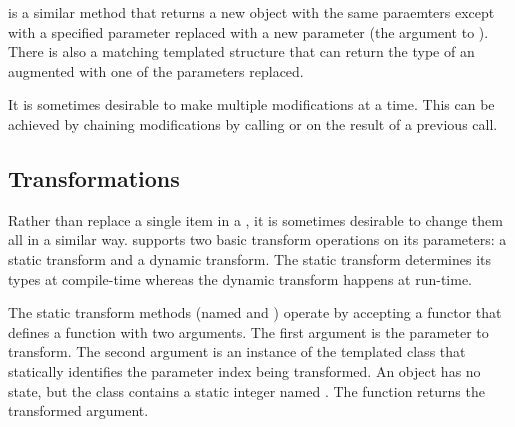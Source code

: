 


 is a similar method that returns a new
 object with the same paraemters except
with a specified parameter replaced with a new parameter (the argument to
). There is also a matching 
templated structure that can return the type of an augmented
 with one of the parameters replaced.



It is sometimes desirable to make multiple modifications at a time. This
can be achieved by chaining modifications by calling  or
 on the result of a previous call.


\subsection{Transformations}

Rather than replace a single item in a ,
it is sometimes desirable to change them all in a similar
way.  supports two basic transform
operations on its parameters: a static transform and a dynamic
transform. The static transform determines its types at compile-time
whereas the dynamic transform happens at run-time.


The static transform methods (named  and
) operate by accepting a functor that defines
a function with two arguments. The first argument is the
 parameter to transform. The second
argument is an instance of the  templated class that
statically identifies the parameter index being transformed. An
 object has no state, but the class contains a
static integer named . The function returns the
transformed argument.

